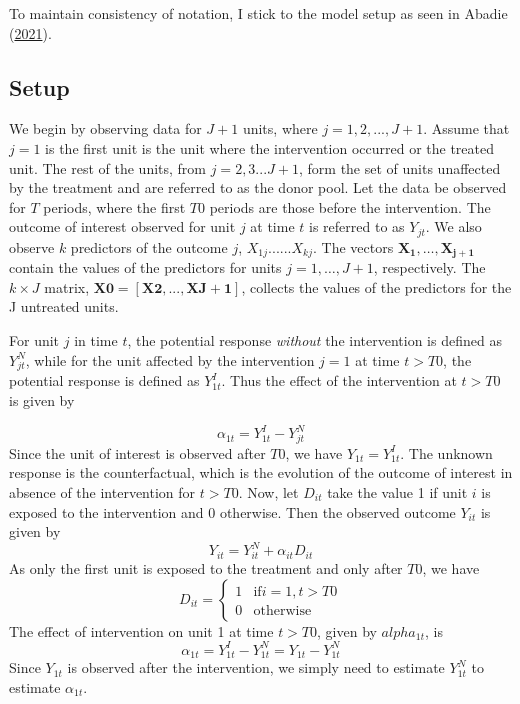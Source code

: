 \documentclass[12pt,nobind, a4paper]{reedthesis}
\begin{document}
 To maintain consistency of notation, I stick to the model setup as seen in Abadie (\protect\hyperlink{ref-abadie_using_2021}{2021}).

 \hypertarget{setup}{%
 \subsection{Setup}\label{setup}}

 We begin by observing data for \(J+1\) units, where \(j=1,2,...,J+1\). Assume that \(j=1\) is the first unit is the unit where the intervention occurred or the treated unit. The rest of the units, from \(j=2,3...J+1\), form the set of units unaffected by the treatment and are referred to as the donor pool. Let the data be observed for \(T\) periods, where the first \(T0\) periods are those before the intervention. The outcome of interest observed for unit \(j\) at time \(t\) is referred to as \(Y_{jt}\). We also observe \(k\) predictors of the outcome \(j\), \(X_{1j}......X_{kj}\). The vectors \(\mathbf{X_{1},…,X_{j+1}}\) contain the values of the predictors for units \(j = 1,…,J + 1\), respectively. The \(k \times J\) matrix, \(\mathbf{X0} = [\mathbf{X2},..., \mathbf{XJ+1}]\), collects the values of the predictors for the J untreated units.
 \linebreak

 For unit \(j\) in time \(t\), the potential response \emph{without} the intervention is defined as \(Y^{N}_{jt}\), while for the unit affected by the intervention \(j=1\) at time \(t>T0\), the potential response is defined as \(Y^{I}_{1t}\). Thus the effect of the intervention at \(t>T0\) is given by

 \[\alpha_{1t}= Y^{I}_{1t}-Y^{N}_{jt}\]
 Since the unit of interest is observed after \(T0\), we have \(Y_{1t}=Y^{I}_{1t}\). The unknown response is the counterfactual, which is the evolution of the outcome of interest in absence of the intervention for \(t>T0\). Now, let \(D_{it}\) take the value 1 if unit \(i\) is exposed to the intervention and 0 otherwise. Then the observed outcome \(Y_{it}\) is given by
 \begin{equation}
 Y_{it}= Y^{N}_{it} + \alpha_{it} D_{it}
 \label{eq:eq1}
 \end{equation}
 As only the first unit is exposed to the treatment and only after \(T0\), we have
 \begin{equation}
 D_{it} = 
 \begin{cases} 
 1 & \text{if} i=1, t>T0 \\
  0 &\text{otherwise}
 \end{cases}
 \label{eq:eq2}
 \end{equation}
 The effect of intervention on unit 1 at time \(t>T0\), given by \(alpha_{1t}\), is
 \begin{equation}
 \alpha_{1t}= Y^{I}_{1t}-Y^{N}_{1t}= Y_{1t}-Y^{N}_{1t}
 \label{eq:eq3}
 \end{equation}
 Since \(Y_{1t}\) is observed after the intervention, we simply need to estimate \(Y^{N}_{1t}\) to estimate \(\alpha_{1t}\).
\end{document}
